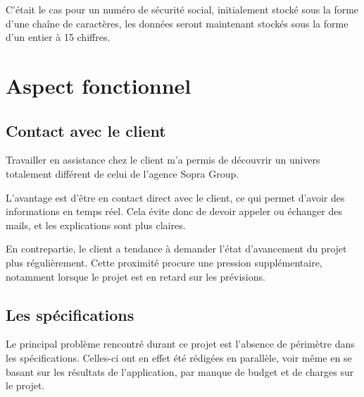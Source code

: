 C'était le cas pour un numéro de sécurité social, initialement stocké sous la forme d'une chaîne de caractères, les données seront maintenant stockés sous la forme d'un entier à 15 chiffres.


\section{Aspect fonctionnel}


\subsection{Contact avec le client}

Travailler en assistance chez le client m'a permis de découvrir un univers totalement différent de celui de l'agence Sopra Group.

L'avantage est d'être en contact direct avec le client, ce qui permet d'avoir des informations en temps réel. Cela évite donc de devoir appeler ou échanger des mails, et les explications sont plus claires.

En contrepartie, le client a tendance à demander l'état d'avancement du projet plus régulièrement.
Cette proximité procure une pression supplémentaire, notamment lorsque le projet est en retard sur les prévisions.


\subsection{Les spécifications}

Le principal problème rencontré durant ce projet est l'absence de périmètre dans les spécifications.
Celles-ci ont en effet été rédigées en parallèle, voir même en se basant sur les résultats de l'application, par manque de budget et de charges sur le projet.

